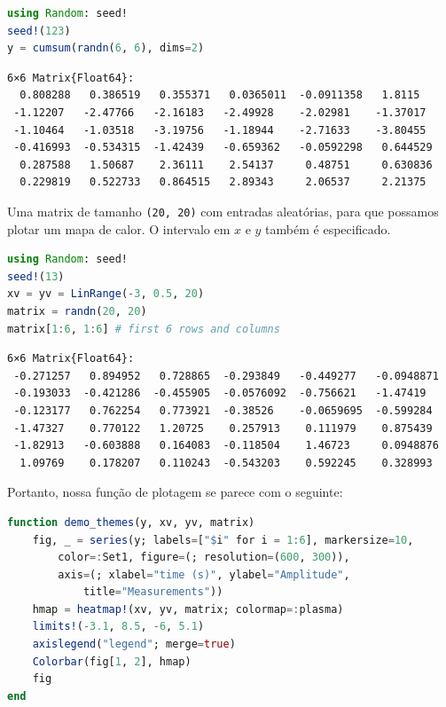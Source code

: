 \documentclass[
  notoc %
]{tufte-book}
\newcommand{\passthrough}[1]{#1}
\begin{document}
\begin{lstlisting}[language=Julia]
using Random: seed!
seed!(123)
y = cumsum(randn(6, 6), dims=2)
\end{lstlisting}

\begin{lstlisting}[language=Output]
6×6 Matrix{Float64}:
  0.808288   0.386519   0.355371   0.0365011  -0.0911358   1.8115
 -1.12207   -2.47766   -2.16183   -2.49928    -2.02981    -1.37017
 -1.10464   -1.03518   -3.19756   -1.18944    -2.71633    -3.80455
 -0.416993  -0.534315  -1.42439   -0.659362   -0.0592298   0.644529
  0.287588   1.50687    2.36111    2.54137     0.48751     0.630836
  0.229819   0.522733   0.864515   2.89343     2.06537     2.21375
\end{lstlisting}

Uma matrix de tamanho \passthrough{\lstinline!(20, 20)!} com entradas
aleatórias, para que possamos plotar um mapa de calor. O intervalo em
\(x\) e \(y\) também é especificado.

\begin{lstlisting}[language=Julia]
using Random: seed!
seed!(13)
xv = yv = LinRange(-3, 0.5, 20)
matrix = randn(20, 20)
matrix[1:6, 1:6] # first 6 rows and columns
\end{lstlisting}

\begin{lstlisting}[language=Output]
6×6 Matrix{Float64}:
 -0.271257   0.894952   0.728865  -0.293849   -0.449277   -0.0948871
 -0.193033  -0.421286  -0.455905  -0.0576092  -0.756621   -1.47419
 -0.123177   0.762254   0.773921  -0.38526    -0.0659695  -0.599284
 -1.47327    0.770122   1.20725    0.257913    0.111979    0.875439
 -1.82913   -0.603888   0.164083  -0.118504    1.46723     0.0948876
  1.09769    0.178207   0.110243  -0.543203    0.592245    0.328993
\end{lstlisting}

Portanto, nossa função de plotagem se parece com o seguinte:

\begin{lstlisting}[language=Julia]
function demo_themes(y, xv, yv, matrix)
    fig, _ = series(y; labels=["$i" for i = 1:6], markersize=10,
        color=:Set1, figure=(; resolution=(600, 300)),
        axis=(; xlabel="time (s)", ylabel="Amplitude",
            title="Measurements"))
    hmap = heatmap!(xv, yv, matrix; colormap=:plasma)
    limits!(-3.1, 8.5, -6, 5.1)
    axislegend("legend"; merge=true)
    Colorbar(fig[1, 2], hmap)
    fig
end
\end{lstlisting}
\end{document}
